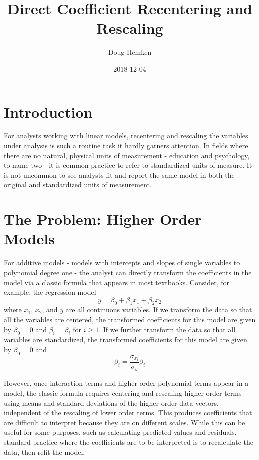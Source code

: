 \documentclass[]{article}
\title{Direct Coefficient Recentering and Rescaling}
\author{Doug Hemken}
\date{2018-12-04}
\begin{document}
\maketitle

{
\setcounter{tocdepth}{3}
\tableofcontents
}
\section{Introduction}\label{introduction}

For analysts working with linear models, recentering and rescaling the
variables under analysis is such a routine task it hardly garners
attention. In fields where there are no natural, physical units of
measurement - education and psychology, to name two - it is common
practice to refer to standardized units of measure. It is not uncommon
to see analysts fit and report the same model in both the original and
standardized units of measurement.

\section{The Problem: Higher Order
Models}\label{the-problem-higher-order-models}

For additive models - models with intercepts and slopes of single
variables to polynomial degree one - the analyst can directly transform
the coefficients in the model via a classic formula that appears in most
textbooks. Consider, for example, the regression model
\[y = \beta_0 + \beta_1x_1 + \beta_2x_2\] where \(x_1\), \(x_2\), and
\(y\) are all continuous variables. If we transform the data so that all
the variables are centered, the transformed coefficients for this model
are given by \(\beta_0=0\) and \(\beta_i=\beta_i\) for \(i\ge 1\). If we
further transform the data so that all variables are standardized, the
transformed coefficients for this model are given by \(\beta_0=0\) and
\[\beta_i=\frac{\sigma_{x_i}}{\sigma_y}\beta_i\]

However, once interaction terms and higher order polynomial terms appear
in a model, the classic formula requires centering and rescaling higher
order terms using means and standard deviations of the higher order data
vectors, independent of the rescaling of lower order terms. This
produces coefficients that are difficult to interpret because they are
on different scales. While this can be useful for some purposes, such as
calculating predicted values and residuals, standard practice where the
coefficients are to be interpreted is to recalculate the data, then
refit the model.
\end{document}
